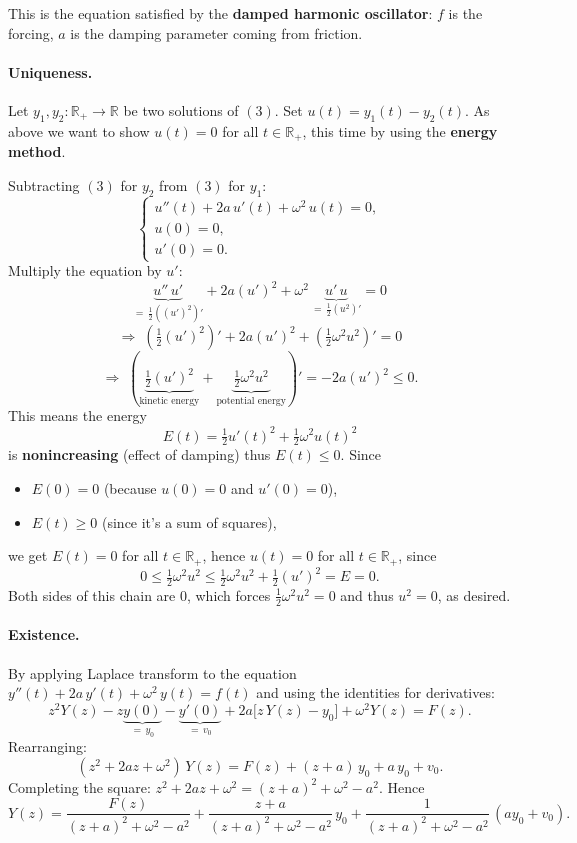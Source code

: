 \begin{remark}
This is the equation satisfied by the \textbf{damped harmonic oscillator}: $f$ is the forcing, $a$ is the damping parameter coming from friction.
\end{remark}

\paragraph{Uniqueness.}
Let $y_1, y_2 : \mathbb{R}_+ \to \mathbb{R}$ be two solutions of $(3)$. Set $u(t) = y_1(t) - y_2(t)$. As above we want to show $u(t) = 0$ for all $t \in \mathbb{R}_+$, this time by using the \textbf{energy method}.

Subtracting $(3)$ for $y_2$ from $(3)$ for $y_1$:
\[
\begin{cases}
u''(t) + 2a\,u'(t) + \omega^2\,u(t) = 0, \\
u(0) = 0, \\
u'(0) = 0.
\end{cases}
\]
Multiply the equation by $u'$:
\[
\underbrace{u''\,u'}_{=\,\frac{1}{2}((u')^2)'} + 2a(u')^2 + \omega^2\,\underbrace{u'\,u}_{=\,\frac{1}{2}(u^2)'} = 0
\]
\[
\Longrightarrow\;
\left(\tfrac{1}{2}(u')^2\right)' + 2a(u')^2 + \left(\tfrac{1}{2}\omega^2 u^2\right)' = 0
\]
\[
\Longrightarrow\;
\left(\underbrace{\tfrac{1}{2}(u')^2}_{\text{kinetic energy}} + \underbrace{\tfrac{1}{2}\omega^2 u^2}_{\text{potential energy}}\right)' = -2a(u')^2 \leq 0.
\]
This means the energy
\[
E(t) = \tfrac{1}{2} u'(t)^2 + \tfrac{1}{2}\omega^2 u(t)^2
\]
is \textbf{nonincreasing} (effect of damping) thus $E(t) \leq 0$. Since
\begin{itemize}
\item $E(0) = 0$ (because $u(0) = 0$ and $u'(0) = 0$),
\item $E(t) \geq 0$ (since it's a sum of squares),
\end{itemize}
we get $E(t) = 0$ for all $t \in \mathbb{R}_+$, hence $u(t) = 0$ for all $t \in \mathbb{R}_+$, since
\[
0 \leq \tfrac{1}{2}\omega^2 u^2 \leq \tfrac{1}{2}\omega^2 u^2 + \tfrac{1}{2}(u')^2 = E = 0.
\]
Both sides of this chain are $0$, which forces $\tfrac{1}{2}\omega^2 u^2 = 0$ and thus $u^2 = 0$, as desired.

\paragraph{Existence.}
By applying Laplace transform to the equation $y''(t) + 2a\,y'(t) + \omega^2\,y(t) = f(t)$ and using the identities for derivatives:
\[
z^2 Y(z) - z\underbrace{y(0)}_{=\,y_0} - \underbrace{y'(0)}_{=\,v_0} + 2a\bigl[z\,Y(z) - y_0\bigr] + \omega^2 Y(z) = F(z).
\]
Rearranging:
\[
(z^2 + 2az + \omega^2)\,Y(z) = F(z) + (z + a)\,y_0 + a\,y_0 + v_0.
\]
Completing the square: $z^2 + 2az + \omega^2 = (z + a)^2 + \omega^2 - a^2$. Hence
\[
Y(z) = \frac{F(z)}{(z+a)^2 + \omega^2 - a^2}
+ \frac{z + a}{(z+a)^2 + \omega^2 - a^2}\,y_0
+ \frac{1}{(z+a)^2 + \omega^2 - a^2}\,(a y_0 + v_0).
\]


